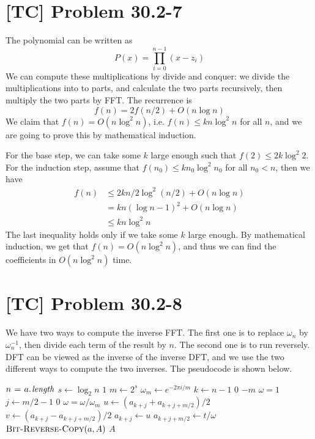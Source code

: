 \documentclass[a4paper,11pt,twocolumn]{article}
\begin{document}
  \section{[TC] Problem 30.2-7}
  The polynomial can be written as
  $$ P(x) = \prod_{i=0}^{n-1} (x-z_i) $$
  We can compute these multiplications by divide and conquer: we divide the multiplications into to parts, and calculate the two parts recursively, then multiply the two parts by FFT. The recurrence is
  $$ f(n) = 2f(n/2) + O(n \log n) $$
  We claim that $f(n) = O(n \log^2 n)$, i.e. $f(n) \leq k n \log^2 n$ for all $n$, and we are going to prove this by mathematical induction. \par
  For the base step, we can take some $k$ large enough such that $f(2) \leq 2k \log^2 2$.
  For the induction step, assume that $f(n_0) \leq k n_0 \log^2 n_0$ for all $n_0 < n$, then we have
  \begin{align*}
    f(n) & \leq 2kn/2 \log^2 (n/2) + O(n \log n) \\
    & = kn(\log n - 1)^2 + O(n \log n) \\
    & \leq kn\log^2 n
  \end{align*}
  The last inequality holds only if we take some $k$ large enough. By mathematical induction, we get that $f(n) = O(n \log^2 n)$, and thus we can find the coefficients in $O(n \log^2 n)$ time.

  \section{[TC] Problem 30.2-8}
  We have two ways to compute the inverse FFT. The first one is to replace $\omega_{n}$ by $\omega_{n}^{-1}$, then divide each term of the result by $n$. The second one is to run  reversely. DFT can be viewed as the inverse of the inverse DFT, and we use the two different ways to compute the two inverses. The pseudocode is shown below.
  \begin{codebox}
    \li $n \gets \attrib{a}{length}$
    \li \For $s \gets \log_2 n$ \Downto $1$
    \li \Do $m \gets 2^s$
    \li     $\omega_m \gets e^{-2 \pi i / m}$
    \li     \For $k \gets n-1 $ \To $0$ \By $-m$
    \li     \Do $\omega = 1$
    \li         \For $j \gets m/2 - 1$ \Downto $0$
    \li         \Do $\omega = \omega / \omega_m$
    \li             $u \gets (a_{k+j} + a_{k+j+m/2})/2$
    \li             $v \gets (a_{k+j} - a_{k+j+m/2})/2$
    \li             $a_{k+j} \gets u$
    \li             $a_{k+j+m/2} \gets t / \omega$
                \End
            \End
        \End
    \li $\textnormal{\scshape Bit-Reverse-Copy}(a, A)$
    \li \Return $A$
    \end{codebox}
\end{document}
